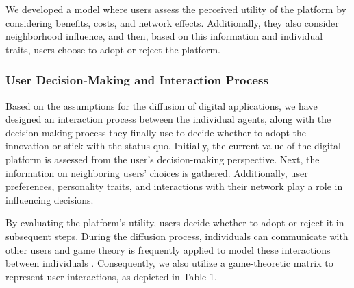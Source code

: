 \documentclass{article} %
\begin{document}
We developed a model where users assess the perceived utility of the platform by considering benefits, costs, and network effects. Additionally, they also consider neighborhood influence, and then, based on this information and individual traits, users choose to adopt or reject the platform. 

\subsubsection{User Decision-Making and Interaction Process}

Based on the assumptions for the diffusion of digital applications, we have designed an interaction process between the individual agents, along with the decision-making process they finally use to decide whether to adopt the innovation or stick with the status quo. Initially, the current value of the digital platform is assessed from the user’s decision-making perspective. Next, the information on neighboring users' choices is gathered. Additionally, user preferences, personality traits, and interactions with their network play a role in influencing decisions. 

By evaluating the platform's utility, users decide whether to adopt or reject it in subsequent steps. During the diffusion process, individuals can communicate with other users and game theory is frequently applied to model these interactions between individuals \cite{ozkan2016evolutionary, zhang2019competitive}. Consequently, we also utilize a game-theoretic matrix to represent user interactions, as depicted in Table 1.
\end{document}
